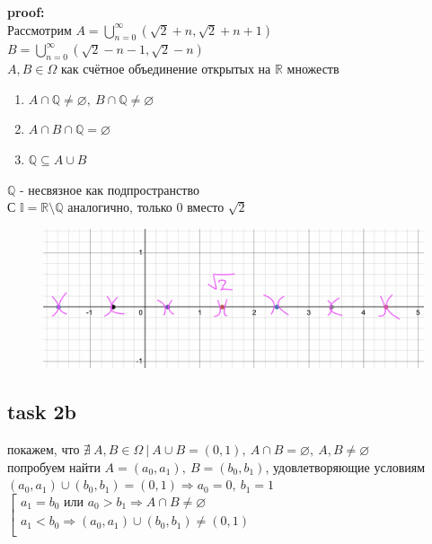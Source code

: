 \documentclass[12pt]{article}
\begin{document}
\textbf{proof:}\\
Рассмотрим $A = \bigcup_{n = 0}^{\infty}(\sqrt{2} + n, \sqrt{2} + n + 1)$\\
$B = \bigcup_{n = 0}^{\infty}(\sqrt{2} - n - 1, \sqrt{2} - n)$\\
$A, B \in \Omega$ как счётное объединение открытых на $\mathbb{R}$ множеств
\begin{enumerate}
    \item $A\cap \mathbb{Q} \neq \varnothing,\ B\cap \mathbb{Q} \neq \varnothing$
    \item $A \cap B \cap \mathbb{Q} = \varnothing$
    \item $\mathbb{Q} \subseteq A \cup B$
\end{enumerate}
$\mathbb{Q}$ - несвязное как подпространство\\
С $\mathbb{I} = \mathbb{R} \setminus \mathbb{Q}$ аналогично, только 0 вместо $\sqrt{2}$
\begin{figure}[h!]
    \centering
    \includegraphics[width=1\linewidth]{hehe.png}
    \label{2}
\end{figure}

\subsection*{task 2b}

покажем, что $\nexists\ A, B \in \Omega\ |\ A\cup B = (0,1),\ A\cap B = \varnothing,\ A, B \neq \varnothing$\\
попробуем найти $A =(a_0,a_1),\ B =(b_0,b_1)$, удовлетворяющие условиям\\
$(a_0,a_1)\cup(b_0,b_1) = (0,1)\Rightarrow a_0=0,\ b_1=1$\\
$\left[ 
    \begin{gathered}
    a_1=b_0 \textrm{ или } a_0 > b_1\Rightarrow A\cap B \neq \varnothing
    \\
    a_1 < b_0 \Rightarrow (a_0,a_1)\cup(b_0,b_1) \neq (0,1)
    \\
    \end{gathered}
\right.$
\end{document}
